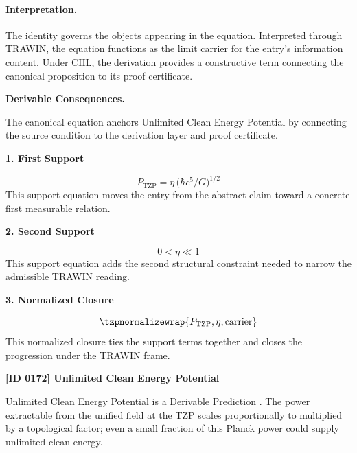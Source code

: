 \paragraph{Interpretation.}
The identity governs the objects appearing in the equation. Interpreted through TRAWIN, the equation functions as the limit carrier for the entry’s information content. Under CHL, the derivation provides a constructive term connecting the canonical proposition to its proof certificate.

\par\vspace{0.35em}
\noindent\textbf{Derivable Consequences.}\quad
\begingroup
\footnotesize
\raggedright
The canonical equation anchors Unlimited Clean Energy Potential by connecting the source condition to the derivation layer and proof certificate.
\par\endgroup

\noindent\textbf{1. First Support}\par
\[
P_{\mathrm{TZP}} = \eta\,\bigl(\hbar c^5/G\bigr)^{1/2}
\]
\noindent This support equation moves the entry from the abstract claim toward a concrete first measurable relation.\par
\noindent\textbf{2. Second Support}\par
\[
0 < \eta \ll 1
\]
\noindent This support equation adds the second structural constraint needed to narrow the admissible TRAWIN reading.\par
\noindent\textbf{3. Normalized Closure}\par
\[
\tzpnormalizewrap{P_{\mathrm{TZP}},\eta,\text{carrier}}
\]
\noindent This normalized closure ties the support terms together and closes the progression under the TRAWIN frame.\par

\clearpage
\noindent\textbf{[ID 0172] Unlimited Clean Energy Potential}\par
\vspace{0.35em}
\begingroup\small
{}
Unlimited Clean Energy Potential is a Derivable Prediction  . The power extractable from the unified field at the TZP scales proportionally to multiplied by a topological factor; even a small fraction of this Planck power could supply unlimited clean energy.  

